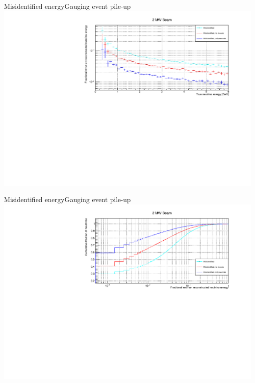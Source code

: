 \documentclass[]{beamer}
\begin{document}
\begin{frame}{Misidentified energy}{Gauging event pile-up}
	\centering
	\includegraphics[width=\textwidth]{pile-up/2MW/misid_rel_x}
\end{frame}

\begin{frame}{Misidentified energy}{Gauging event pile-up}
	\centering
	\includegraphics[width=\textwidth]{pile-up/2MW/misid_rel_y}
\end{frame}
\end{document}
